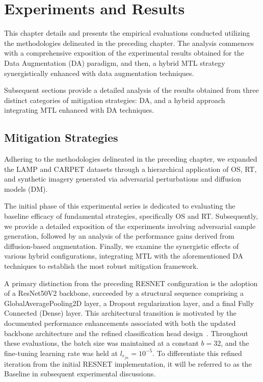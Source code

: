 \chapter{Experiments and Results}
\label{ch3v2}
\ifpdf
    \graphicspath{{Chapter3/Figs/Raster/}{Chapter3/Figs/PDF/}{Chapter3/Figs/}}
\else
    \graphicspath{{Chapter3/Figs/Vector/}{Chapter3/Figs/}}
\fi
%

This chapter details and presents the empirical evaluations conducted utilizing the methodologies delineated in the preceding chapter. 
The analysis commences with a comprehensive exposition of the experimental results obtained for the Data Augmentation (DA) paradigm, and then, a hybrid MTL strategy synergistically enhanced with data augmentation techniques.

Subsequent sections provide a detailed analysis of the results obtained from three distinct categories of mitigation strategies: DA, and a hybrid approach integrating MTL enhanced with DA techniques.

%
\section{Mitigation Strategies}
%
Adhering to the methodologies delineated in the preceding chapter, we expanded the LAMP and CARPET datasets through a hierarchical application of OS, RT, and synthetic imagery generated via adversarial perturbations and diffusion models (DM).

The initial phase of this experimental series is dedicated to evaluating the baseline efficacy of fundamental strategies, specifically OS and RT. 
Subsequently, we provide a detailed exposition of the experiments involving adversarial sample generation, followed by an analysis of the performance gains derived from diffusion-based augmentation. Finally, we examine the synergistic effects of various hybrid configurations, integrating MTL with the aforementioned DA techniques to establish the most robust mitigation framework.

A primary distinction from the preceding RESNET configuration is the adoption of a ResNet50V2 backbone, succeeded by a structural sequence comprising a GlobalAveragePooling2D layer, a Dropout regularization layer, and a final Fully Connected (Dense) layer. 
This architectural transition is motivated by the documented performance enhancements associated with both the updated backbone architecture and the refined classification head design~\citep{szegedy2015going}.
Throughout these evaluations, the batch size was maintained at a constant $b=32$, and the fine-tuning learning rate was held at $l_{r_{fn}}=10^{-5}$. To differentiate this refined iteration from the initial RESNET implementation, it will be referred to as the Baseline in subsequent experimental discussions.

